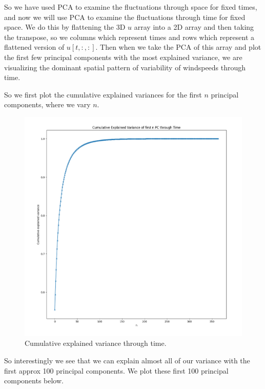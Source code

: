 \documentclass[a4paper, oneside]{book}
\begin{document}
So we have used PCA to examine the fluctuations through space for fixed times, and now we will
use PCA to examine the fluctuations through time for fixed space.
We do this by flattening the 3D $u$ array into a 2D array and then taking the transpose,
so we columns which represent times and rows which represent a flattened version of $u[t, :, :]$. 
Then when we take the PCA of this array and plot the first few principal components with
the most explained variance, we are visualizing the dominant spatial pattern of variability of windspeeds through time.


So we first plot the cumulative explained variances for the first $n$ principal
components, where we vary $n$. 
\begin{figure}[htpb]
    \centering
    \includegraphics[width=1.0\textwidth]{./images/explained_var_through_time.png}
    \caption{Cumulative explained variance through time.}
\end{figure}

So interestingly we see that we can explain
almost all of our variance with the first approx 100 principal components.
We plot these first 100 principal components below.
\end{document}

